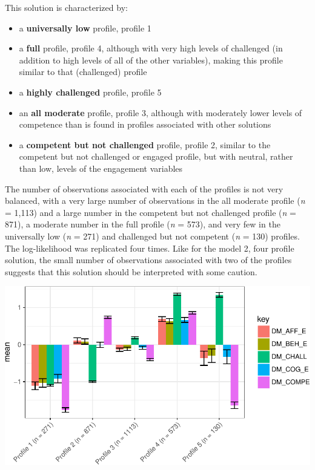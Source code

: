 \documentclass[]{msu-thesis}
\providecommand{\tightlist}{%
  \setlength{\itemsep}{0pt}\setlength{\parskip}{0pt}}
\theoremstyle{definition}
\theoremstyle{definition}
\theoremstyle{definition}
\theoremstyle{remark}
\begin{document}
This solution is characterized by:

\begin{itemize}
\tightlist
\item
  a \textbf{universally low} profile, profile 1
\item
  a \textbf{full} profile, profile 4, although with very high levels of
  challenged (in addition to high levels of all of the other variables),
  making this profile similar to that (challenged) profile
\item
  a \textbf{highly challenged} profile, profile 5
\item
  an \textbf{all moderate} profile, profile 3, although with moderately
  lower levels of competence than is found in profiles associated with
  other solutions
\item
  a \textbf{competent but not challenged} profile, profile 2, similar to
  the competent but not challenged or engaged profile, but with neutral,
  rather than low, levels of the engagement variables
\end{itemize}

The number of observations associated with each of the profiles is not
very balanced, with a very large number of observations in the all
moderate profile (\emph{n} = 1,113) and a large number in the competent
but not challenged profile (\emph{n} = 871), a moderate number in the
full profile (\emph{n} = 573), and very few in the universally low
(\emph{n} = 271) and challenged but not competent (\emph{n} = 130)
profiles. The log-likelihood was replicated four times. Like for the
model 2, four profile solution, the small number of observations
associated with two of the profiles suggests that this solution should
be interpreted with some caution.

\begin{center}\includegraphics[width=0.8\linewidth]{rosenberg-dissertation_files/figure-latex/m2_5p-1} \end{center}
\end{document}
